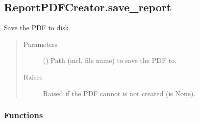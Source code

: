 \documentclass[letterpaper,10pt,english]{sphinxmanual}
\begin{document}
\begin{fulllineitems}
\subsection{ReportPDFCreator.save\_report}
\label{\detokenize{generated/quality_assessment.quality_pdf_report.ReportPDFCreator.save_report:reportpdfcreator-save-report}}\label{\detokenize{generated/quality_assessment.quality_pdf_report.ReportPDFCreator.save_report::doc}}

\begin{fulllineitems}
\label{\detokenize{generated/quality_assessment.quality_pdf_report.ReportPDFCreator.save_report:quality_assessment.quality_pdf_report.ReportPDFCreator.save_report}}
\sphinxAtStartPar
Save the PDF to disk.
\begin{quote}\begin{description}
\item[{Parameters}] \leavevmode
\sphinxAtStartPar
{} () \textendash{} Path (incl. file name) to save the PDF to.

\item[{Raises}] \leavevmode
\sphinxAtStartPar
{} \textendash{} Raised if the PDF cannot is not created (is None).

\end{description}\end{quote}

\end{fulllineitems}


\end{fulllineitems}

\subsubsection*{Functions}
\end{document}
